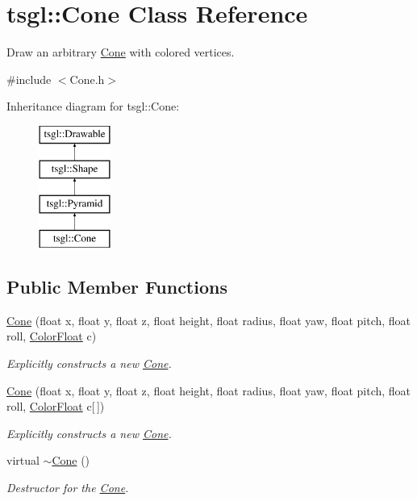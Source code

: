 \hypertarget{classtsgl_1_1_cone}{}\section{tsgl\+:\+:Cone Class Reference}
\label{classtsgl_1_1_cone}


Draw an arbitrary \hyperlink{classtsgl_1_1_cone}{Cone} with colored vertices.  




{\ttfamily \#include $<$Cone.\+h$>$}

Inheritance diagram for tsgl\+:\+:Cone\+:\begin{figure}[H]
\begin{center}
\leavevmode
\includegraphics[height=4.000000cm]{classtsgl_1_1_cone}
\end{center}
\end{figure}
\subsection*{Public Member Functions}
\begin{DoxyCompactItemize}
\item 
\hyperlink{classtsgl_1_1_cone_a1bbc50a0f701f7124426d62ef3cfc6d7}{Cone} (float x, float y, float z, float height, float radius, float yaw, float pitch, float roll, \hyperlink{structtsgl_1_1_color_float}{Color\+Float} c)
\begin{DoxyCompactList}\small\item\em Explicitly constructs a new \hyperlink{classtsgl_1_1_cone}{Cone}. \end{DoxyCompactList}\item 
\hyperlink{classtsgl_1_1_cone_aabdb5094d21ce830a5a08893b51c5bc5}{Cone} (float x, float y, float z, float height, float radius, float yaw, float pitch, float roll, \hyperlink{structtsgl_1_1_color_float}{Color\+Float} c\mbox{[}$\,$\mbox{]})
\begin{DoxyCompactList}\small\item\em Explicitly constructs a new \hyperlink{classtsgl_1_1_cone}{Cone}. \end{DoxyCompactList}\item 
\mbox{\label{classtsgl_1_1_cone_ac6611697b725375106016762f1cafc48}} 
virtual \hyperlink{classtsgl_1_1_cone_ac6611697b725375106016762f1cafc48}{$\sim$\+Cone} ()
\begin{DoxyCompactList}\small\item\em Destructor for the \hyperlink{classtsgl_1_1_cone}{Cone}. \end{DoxyCompactList}\end{DoxyCompactItemize}
